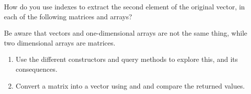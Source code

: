 \documentclass[krantz2]{krantz}\usepackage{knitr}%
\begin{document}
\begin{playground}
  How do you use indexes to extract the second element of the original vector, in each of the following matrices and arrays?

\begin{knitrout}\footnotesize
{}\color{fgcolor}\begin{kframe}
\begin{alltt}
 \hlkwb{<-} \hlopt{:}
 \hlkwb{<-}   \hlstd{=} \hlstd{)}
 \hlkwb{<-}   \hlstd{=} \hlstd{,}  \hlstd{=} \hlstd{)}
 \hlkwb{<-}   \hlstd{=} \hlstd{)}
 \hlkwb{<-}   \hlstd{=} \hlstd{,}  \hlstd{=} \hlstd{)}
\end{alltt}
\end{kframe}
\end{knitrout}

\begin{knitrout}\footnotesize
{}\color{fgcolor}\begin{kframe}
\begin{alltt}
 \hlkwb{<-} \hlopt{:}
 \hlkwb{<-}   \hlstd{=} \hlstd{(}\hlstd{,} \hlstd{))}
 \hlkwb{<-}   \hlstd{=} \hlstd{(}\hlstd{,} \hlstd{),}  \hlstd{=} \hlstd{(}\hlstd{,} \hlstd{(}\hlstd{,} \hlstd{)))}
 \hlkwb{<-}   \hlstd{=} \hlstd{(}\hlstd{,} \hlstd{))}
\end{alltt}
\end{kframe}
\end{knitrout}

Be aware that vectors and one-dimensional arrays are not the same thing, while two dimensional arrays are matrices.
\begin{enumerate}
      \item Use the different constructors and query methods to explore this, and its consequences.
      \item Convert a matrix into a vector using  and  and compare the returned values.
\end{enumerate}

\end{playground}
\end{document}
